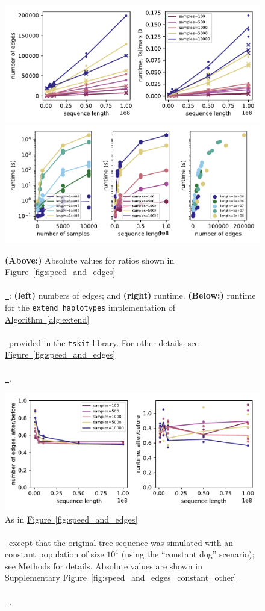 \documentclass[10pt,twoside,lineno]{gsajnl}
\newcommand{\tskit}{\texttt{tskit}}
\newcommand{\algorithmref}[2][]{%
	\hyperref[{#2}]{%
		Algorithm~\ref*{#2}%
		\ifx\\#1\\%
		\else
		\,#1%
		\fi
	}%
}
\newcommand*{\figref}[2][]{%
	\hyperref[{#2}]{%
		Figure~\ref*{#2}%
		\ifx\\#1\\%
		\else
		\,#1%
		\fi
	}%
}
\begin{document}


\appendix
\renewcommand{\thefigure}{S\arabic{figure}}
\setcounter{figure}{0}

\begin{figure}
    \includegraphics{benchmarks/one_pop_results_absolute_values}
    \includegraphics{benchmarks/one_pop_results_timing}
    \caption{
        \textbf{(Above:)}
        Absolute values for ratios shown in \figref{fig:speed_and_edges}:
        \textbf{(left)} numbers of edges; and
        \textbf{(right)} runtime.
        \textbf{(Below:)} runtime for the \texttt{extend\_haplotypes}
        implementation of \algorithmref{alg:extend} provided in the \tskit{} library.
        For other details, see \figref{fig:speed_and_edges}.
        \label{fig:speed_and_edges_other}
    }
\end{figure}

\begin{figure}
    \includegraphics{benchmarks/constant_pop_results_ratios}
    \caption{
        As in \figref{fig:speed_and_edges} except that
        the original tree sequence was simulated with an constant population
        of size $10^4$ (using the ``constant dog'' scenario);
        see Methods for details.
        Absolute values are shown in Supplementary \figref{fig:speed_and_edges_constant_other}.
        \label{fig:speed_and_edges_constant}
    }
\end{figure}
\end{document}
